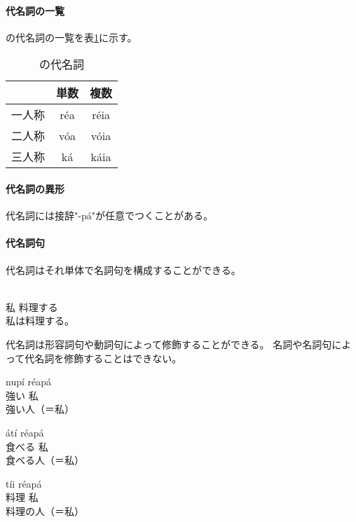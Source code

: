 \paragraph{代名詞の一覧}
\langname の代名詞の一覧を表\ref{tab:pronouns}に示す。

\begin{table}[H]
    \centering
    \begin{tabular}{lcc}
        \toprule
        & 単数 & 複数 \\
        \midrule
        一人称 & r\'ea & r\'eia \\
        二人称 & v\'oa & v\'oia \\
        三人称 & k\'a & k\'aia \\
  \bottomrule
    \end{tabular}
    \caption{\centering \langname の代名詞}
    \label{tab:pronouns}
\end{table}

\paragraph{代名詞の異形}

代名詞には接辞"-p\'a"が任意でつくことがある。

\paragraph{代名詞句}

代名詞はそれ単体で名詞句を構成することができる。

\begin{exe}
    \ex \gll [r\'ea] [p\'a\'a t\'ii nep\'e\'a] \\
        私 料理する \\
    \glt 私は料理する。
\end{exe}

代名詞は形容詞句や動詞句によって修飾することができる。
名詞や名詞句によって代名詞を修飾することはできない。

\begin{exe}
    \ex \gll nup\'i r\'eap\'a \\
        強い 私 \\
    \glt 強い人（＝私）
\end{exe}
\begin{exe}
    \ex \gll \'at\'i r\'eap\'a \\
        食べる 私 \\
    \glt 食べる人（＝私）
\end{exe}
\begin{exe}
    \ex \gll *t\'ii r\'eap\'a \\
        料理 私 \\
    \glt 料理の人（＝私）
\end{exe}

